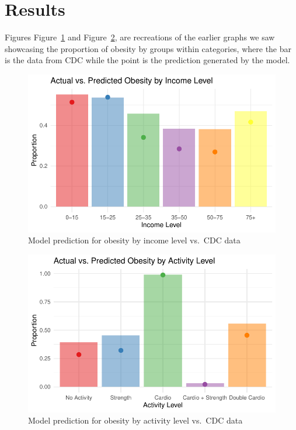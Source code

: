 \documentclass[
  letterpaper,
  DIV=11,
  numbers=noendperiod]{scrartcl}
\begin{document}
\newpage

\hypertarget{results}{%
\section{Results}\label{results}}

Figures Figure~\ref{fig-pactivity} and Figure~\ref{fig-pobesity}, are
recreations of the earlier graphs we saw showcasing the proportion of
obesity by groups within categories, where the bar is the data from CDC
while the point is the prediction generated by the model.

\begin{figure}

{\centering \includegraphics[width=\textwidth,height=0.25\textheight]{paper_files/figure-pdf/fig-pactivity-1.pdf}

}

\caption{\label{fig-pactivity}Model prediction for obesity by income
level vs.~CDC data}

\end{figure}

\begin{figure}

{\centering \includegraphics[width=\textwidth,height=0.25\textheight]{paper_files/figure-pdf/fig-pobesity-1.pdf}

}

\caption{\label{fig-pobesity}Model prediction for obesity by activity
level vs.~CDC data}

\end{figure}
\end{document}

